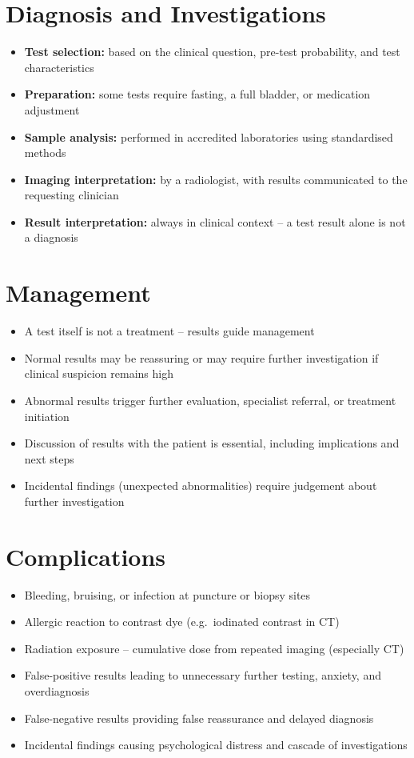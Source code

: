 \section*{Diagnosis and Investigations}
\begin{itemize}
    \item \textbf{Test selection:} based on the clinical question, pre-test probability, and test characteristics
    \item \textbf{Preparation:} some tests require fasting, a full bladder, or medication adjustment
    \item \textbf{Sample analysis:} performed in accredited laboratories using standardised methods
    \item \textbf{Imaging interpretation:} by a radiologist, with results communicated to the requesting clinician
    \item \textbf{Result interpretation:} always in clinical context -- a test result alone is not a diagnosis
\end{itemize}

\section*{Management}
\begin{itemize}
    \item A test itself is not a treatment -- results guide management
    \item Normal results may be reassuring or may require further investigation if clinical suspicion remains high
    \item Abnormal results trigger further evaluation, specialist referral, or treatment initiation
    \item Discussion of results with the patient is essential, including implications and next steps
    \item Incidental findings (unexpected abnormalities) require judgement about further investigation
\end{itemize}

\section*{Complications}
\begin{itemize}
    \item Bleeding, bruising, or infection at puncture or biopsy sites
    \item Allergic reaction to contrast dye (e.g.\ iodinated contrast in CT)
    \item Radiation exposure -- cumulative dose from repeated imaging (especially CT)
    \item False-positive results leading to unnecessary further testing, anxiety, and overdiagnosis
    \item False-negative results providing false reassurance and delayed diagnosis
    \item Incidental findings causing psychological distress and cascade of investigations
\end{itemize}

